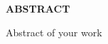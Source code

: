 
\begin{center}
  {\Large{\bf{ABSTRACT}}}
\end{center}

\vspace{2em}
Abstract of your work
\vspace{2em}

\clearpage
